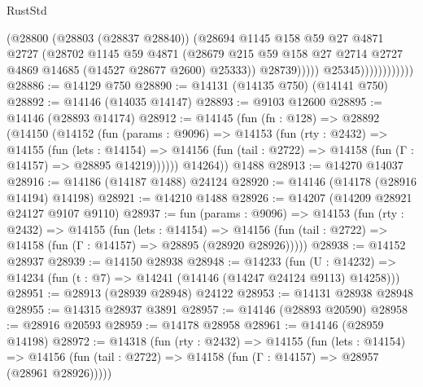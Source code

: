 \begin{lexlean}{RustStd}
\begin{coremodule}
                                  (@28800
                                    (@28803 (@28837 @28840))
                                    (@28694
                                      @1145
                                      @158
                                      @59
                                      @27
                                      @4871
                                      @2727
                                      (@28702
                                        @1145
                                        @59
                                        @4871
                                        (@28679
                                          @215
                                          @59
                                          @158
                                          @27
                                          @2714
                                          @2727
                                          @4869
                                          @14685
                                          (@14527 @28677 @2600)
                                          @25333))
                                      @28739)))))
                            @25345))))))))))))
@28886 := @14129 @750
@28890 := @14131 (@14135 @750) (@14141 @750)
@28892 := @14146 (@14035 @14147)
@28893 := @9103 @12600
@28895 := @14146 (@28893 @14174)
@28912 := @14145
    (fun (fn : @128) =>
    @28892
      (@14150
        (@14152
          (fun (params : @9096) =>
          @14153
            (fun (rty : @2432) =>
            @14155
              (fun (lets : @14154) =>
              @14156 (fun (tail : @2722) => @14158 (fun (Γ : @14157) => @28895 @14219))))))
        @14264))
    @1488
@28913 := @14270 @14037
@28916 := @14186 (@14187 @1488) @24124
@28920 := @14146 (@14178 (@28916 @14194) @14198)
@28921 := @14210 @1488
@28926 := @14207 (@14209 @28921 @24127 @9107 @9110)
@28937 := fun (params : @9096) =>
  @14153
    (fun (rty : @2432) =>
    @14155
      (fun (lets : @14154) =>
      @14156 (fun (tail : @2722) => @14158 (fun (Γ : @14157) => @28895 (@28920 @28926)))))
@28938 := @14152 @28937
@28939 := @14150 @28938
@28948 := @14233
    (fun (U : @14232) => @14234 (fun (t : @7) => @14241 (@14146 (@14247 @24124 @9113) @14258)))
@28951 := @28913 (@28939 @28948) @24122
@28953 := @14131 @28938 @28948
@28955 := @14315 @28937 @3891
@28957 := @14146 (@28893 @20590)
@28958 := @28916 @20593
@28959 := @14178 @28958
@28961 := @14146 (@28959 @14198)
@28972 := @14318
    (fun (rty : @2432) =>
    @14155
      (fun (lets : @14154) =>
      @14156 (fun (tail : @2722) => @14158 (fun (Γ : @14157) => @28957 (@28961 @28926)))))

\end{coremodule}
\end{lexlean}
